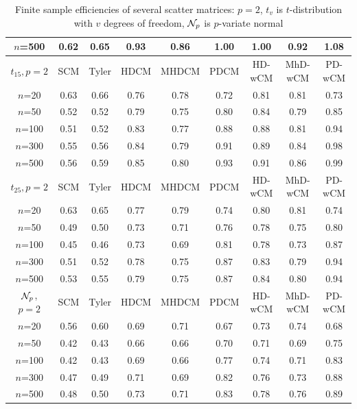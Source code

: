 \begin{table}[ht]
\begin{footnotesize}
\begin{tabular}{c|cc|ccc|ccc}
    $n$=500                  & 0.62 & 0.65  & 0.93   & 0.86   & 1.00  & 1.00    & 0.92    & 1.08   \\ \hline
    $t_{15}, p=2$ & SCM  & Tyler & HDCM & MHDCM & PDCM & HD-wCM & MhD-wCM & PD-wCM \\ \hline
    $n$=20                   & 0.63 & 0.66  & 0.76   & 0.78   & 0.72  & 0.81    & 0.81    & 0.73   \\
    $n$=50                   & 0.52 & 0.52  & 0.79   & 0.75   & 0.80  & 0.84    & 0.79    & 0.85   \\
    $n$=100                  & 0.51 & 0.52  & 0.83   & 0.77   & 0.88  & 0.88    & 0.81    & 0.94   \\
    $n$=300                  & 0.55 & 0.56  & 0.84   & 0.79   & 0.91  & 0.89    & 0.84    & 0.98   \\
    $n$=500                  & 0.56 & 0.59  & 0.85   & 0.80   & 0.93  & 0.91    & 0.86    & 0.99   \\ \hline
    $t_{25}, p=2$ & SCM  & Tyler & HDCM & MHDCM & PDCM & HD-wCM & MhD-wCM & PD-wCM \\ \hline
    $n$=20                   & 0.63 & 0.65  & 0.77   & 0.79   & 0.74  & 0.80    & 0.81    & 0.74   \\
    $n$=50                   & 0.49 & 0.50  & 0.73   & 0.71   & 0.76  & 0.78    & 0.75    & 0.80   \\
    $n$=100                  & 0.45 & 0.46  & 0.73   & 0.69   & 0.81  & 0.78    & 0.73    & 0.87   \\
    $n$=300                  & 0.51 & 0.52  & 0.78   & 0.75   & 0.87  & 0.83    & 0.79    & 0.94   \\
    $n$=500                  & 0.53 & 0.55  & 0.79   & 0.75   & 0.87  & 0.84    & 0.80    & 0.94   \\ \hline
    ${\cal{N}}_p$, $p=2$                & SCM  & Tyler & HDCM & MHDCM & PDCM & HD-wCM & MhD-wCM & PD-wCM \\ \hline
    $n$=20                   & 0.56 & 0.60  & 0.69   & 0.71   & 0.67  & 0.73    & 0.74    & 0.68   \\
    $n$=50                   & 0.42 & 0.43  & 0.66   & 0.66   & 0.70  & 0.71    & 0.69    & 0.75   \\
    $n$=100                  & 0.42 & 0.43  & 0.69   & 0.66   & 0.77  & 0.74    & 0.71    & 0.83   \\
    $n$=300                  & 0.47 & 0.49  & 0.71   & 0.69   & 0.82  & 0.76    & 0.73    & 0.88   \\
    $n$=500                  & 0.48 & 0.50  & 0.73   & 0.71   & 0.83  & 0.78    & 0.76    & 0.89   \\ \hline
    \end{tabular}
\caption{Finite sample efficiencies of several scatter matrices: $p=2$, $t_v$ is $t$-distribution with $v$ degrees of freedom, ${\cal{N}}_p$ is $p$-variate normal}
\label{table:FSEtable2}
\end{footnotesize}
\end{table}
